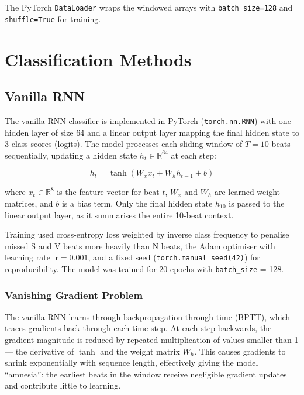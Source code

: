 \documentclass[twocolumn, fontsize=10pt]{article}
\begin{document}
The PyTorch \texttt{DataLoader} wraps the windowed arrays with \texttt{batch\_size=128} and \texttt{shuffle=True} for training.


\section{Classification Methods}
\label{sec:methods_class}

\subsection{Vanilla RNN}

The vanilla RNN classifier is implemented in PyTorch (\texttt{torch.nn.RNN}) with one 
hidden layer of size 64 and a linear output layer mapping the final hidden state to 3 
class scores (logits). The model processes each sliding window of $T=10$ beats 
sequentially, updating a hidden state $h_t \in \mathbb{R}^{64}$ at each step:

\[
h_t = \tanh(W_x x_t + W_h h_{t-1} + b)
\]

where $x_t \in \mathbb{R}^{8}$ is the feature vector for beat $t$, $W_x$ and $W_h$ are 
learned weight matrices, and $b$ is a bias term. Only the final hidden state $h_{10}$ 
is passed to the linear output layer, as it summarises the entire 10-beat context.

Training used cross-entropy loss weighted by inverse class frequency to penalise missed 
S and V beats more heavily than N beats, the Adam optimiser with learning rate 
$\text{lr} = 0.001$, and a fixed seed (\texttt{torch.manual\_seed(42)}) for 
reproducibility. The model was trained for 20 epochs with \texttt{batch\_size} = 128.


\subsubsection{Vanishing Gradient Problem}

The vanilla RNN learns through backpropagation through time (BPTT), which traces 
gradients back through each time step. At each step backwards, the gradient magnitude 
is reduced by repeated multiplication of values smaller than 1 — the derivative of 
$\tanh$ and the weight matrix $W_h$. This causes gradients to shrink exponentially with 
sequence length, effectively giving the model ``amnesia'': the earliest beats in the 
window receive negligible gradient updates and contribute little to learning.
\end{document}
